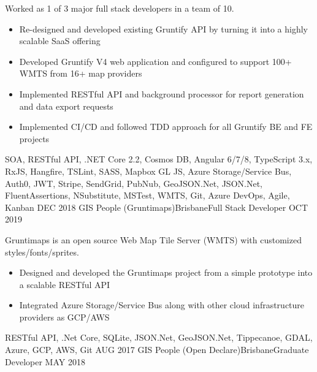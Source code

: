 \begin{experiences}
{                    Worked as 1 of 3 major full stack developers in a team of 10.
                      \begin{itemize}
                        \item Re-designed and developed existing Gruntify API by turning it into a highly scalable SaaS offering
                        \item Developed Gruntify V4 web application and configured to support 100+ WMTS from 16+ map providers
                        \item Implemented RESTful API and background processor for report generation and data export requests
                        \item Implemented CI/CD and followed TDD approach for all Gruntify BE and FE projects
                      \end{itemize}
                    }
                    {SOA, RESTful API, .NET Core 2.2, Cosmos DB, Angular 6/7/8, TypeScript 3.x, RxJS, Hangfire, TSLint, SASS, Mapbox GL JS, Azure Storage/Service Bus, Auth0, JWT, Stripe, SendGrid, PubNub, GeoJSON.Net, JSON.Net, FluentAssertions, NSubstitute, MSTest, WMTS, Git, Azure DevOps, Agile, Kanban}
    \emptySeparator
    \experience
    {DEC 2018}   {GIS People (Gruntimaps)}{Brisbane}{Full Stack Developer}
    {OCT 2019} {
                    Gruntimaps is an open source Web Map Tile Server (WMTS) with customized styles/fonts/sprites.
                      \begin{itemize}
                        \item Designed and developed the Gruntimaps project from a simple prototype into a scalable RESTful API
                        \item Integrated Azure Storage/Service Bus along with other cloud infrastructure providers as GCP/AWS
                      \end{itemize}
                    }
                    {RESTful API, .Net Core, SQLite, JSON.Net, GeoJSON.Net, Tippecanoe, GDAL, Azure, GCP, AWS, Git}
  \emptySeparator
  \experience
    {AUG 2017}   {GIS People (Open Declare)}{Brisbane}{Graduate Developer}
    {MAY 2018} {
}
\end{experiences}
